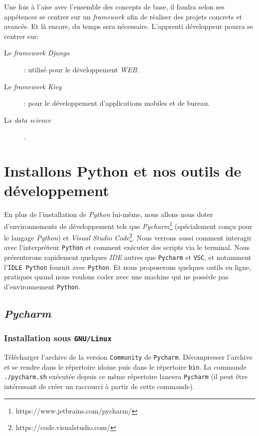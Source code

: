 \documentclass[a4paper,12pt]{book}
\begin{document}
Une fois à l'aise avec l'ensemble des concepts de base, il faudra selon ses appétences se centrer sur un \textit{framework} afin de réaliser des projets concrets et avancés. Et là encore, du temps sera nécessaire. L'apprenti développeur pourra se centrer sur:
\begin{description}
    \item[Le \textit{framework Django}]: utilisé pour le développement \textit{WEB}.
    \item[Le \textit{framework Kivy}]: pour le développement d'applications mobiles et de bureau.
    \item[La \textit{data science}].
\end{description}
\chapter{Installons Python et nos outils de développement}
En plus de l'installation de \textit{Python} lui-même, nous allons nous doter d'environnements de développement tels que \textit{Pycharm}\footnote{https://www.jetbrains.com/pycharm/} (spécialement conçu pour le langage \textit{Python}) et \textit{Visual Studio Code}\footnote{https://code.visualstudio.com/}. Nous verrons aussi comment interagir avec l'interpréteur \texttt{Python} et comment exécuter des scripts via le terminal. Nous présenterons rapidement quelques \textit{IDE} autres que \texttt{Pycharm} et \texttt{VSC}, et notamment l'\texttt{IDLE Python} fournit avec \texttt{Python}. Et nous proposerons quelques outils en ligne, pratiques quand nous voulons coder avec une machine qui ne possède pas d'environnement \texttt{Python}.
\medskip

\section{\textit{Pycharm}}
\subsection*{Installation sous \texttt{GNU/Linux}}
Télécharger l'archive de la version \texttt{Community} de \texttt{Pycharm}. Décompresser l'archive et se rendre dans le répertoire idoine puis dans le répertoire \texttt{bin}. La commande \verb|./pycharm.sh| exécutée depuis ce même répertoire lancera \texttt{Pycharm} (il peut être intéressant de créer un raccourci à partir de cette commande).
\medskip
\end{document}
